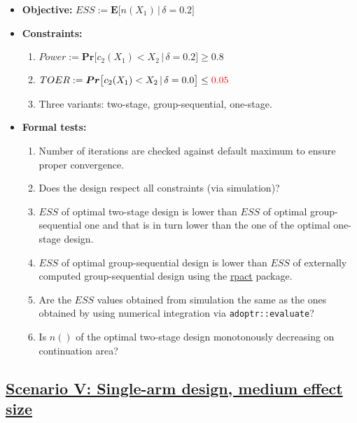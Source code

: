 \documentclass[
]{book}
\providecommand{\tightlist}{%
  \setlength{\itemsep}{0pt}\setlength{\parskip}{0pt}}
\begin{document}
\begin{itemize}
\tightlist
\item
  \textbf{Objective:} \(ESS := \boldsymbol{E}\big[n(X_1)\,|\,\delta=0.2\big]\)
\item
  \textbf{Constraints:}

  \begin{enumerate}
  \def\labelenumi{\arabic{enumi}.}
  \tightlist
  \item
    \(Power := \boldsymbol{Pr}\big[c_2(X_1) < X_2\,|\,\delta=0.2\big] \geq 0.8\)
  \item
    \(TOER := \boldsymbol{Pr}\big[c_2(X_1) < X_2\,|\,\delta=0.0\big] \leq \color{red}{0.05}\)
  \item
    Three variants: two-stage, group-sequential, one-stage.
  \end{enumerate}
\item
  \textbf{Formal tests:}

  \begin{enumerate}
  \def\labelenumi{\arabic{enumi}.}
  \tightlist
  \item
    Number of iterations are checked against default maximum to ensure proper
    convergence.
  \item
    Does the design respect all constraints (via simulation)?
  \item
    \(ESS\) of optimal two-stage design is lower than \(ESS\) of optimal
    group-sequential one and that is in turn lower than the one of the
    optimal one-stage design.
  \item
    \(ESS\) of optimal group-sequential design is lower than \(ESS\) of
    externally computed group-sequential design using the \href{https://rpact.org/}{rpact} package.
  \item
    Are the \(ESS\) values obtained from simulation the same as the ones
    obtained by using numerical integration via \texttt{adoptr::evaluate}?
  \item
    Is \(n()\) of the optimal two-stage design monotonously decreasing on
    continuation area?
  \end{enumerate}
\end{itemize}

\hypertarget{scenario-v-single-arm-design-medium-effect-size}{%
\subsection{\texorpdfstring{\protect\hyperlink{scenarioV}{Scenario V: Single-arm design, medium effect size}}{Scenario V: Single-arm design, medium effect size}}\label{scenario-v-single-arm-design-medium-effect-size}}
\end{document}
